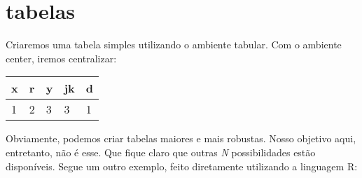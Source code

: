 %
%

\chapter{tabelas}
\label{cap:tabelas}


Criaremos uma tabela simples utilizando o ambiente tabular. Com o ambiente center, iremos centralizar:



\begin{table}[!h]
\centering
\begin{tabular}{lllll}
\hline
x & r & y & jk & d \\ \hline
1 & 2 & 3 & 3  & 1
\end{tabular}
\end{table}

Obviamente, podemos criar tabelas maiores e mais robustas. Nosso objetivo aqui, entretanto, não é esse. Que fique claro que outras \textit{N} possibilidades estão disponíveis. Segue um outro exemplo, feito diretamente utilizando a linguagem R:

